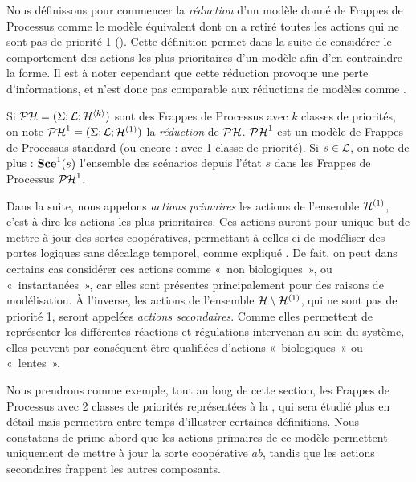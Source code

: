 Nous définissons pour commencer la \emph{réduction} d'un modèle donné de Frappes de Processus
comme le modèle équivalent dont on a retiré toutes les actions qui ne sont pas de priorité 1
().
Cette définition permet dans la suite de considérer le comportement des actions les plus prioritaires
d'un modèle afin d'en contraindre la forme.
Il est à noter cependant que cette réduction provoque une perte d'informations,
et n'est donc pas comparable aux réductions de modèles comme \cite{Naldi09}.

\begin{definition}
  Si $\PH = (\PHs; \PHl; \PHh^{\langle k \rangle})$ sont des Frappes de Processus avec $k$
  classes de priorités, on note $\reduction[\PH] = (\PHs; \PHl; \PHh^{(1)})$
  la \emph{réduction} de $\PH$.
  $\reduction$ est un modèle de Frappes de Processus standard
  (ou encore : avec 1 classe de priorité).
  Si $s \in \PHl$, on note de plus : $\reduction[\Sce](s)$ l'ensemble des scénarios
  depuis l'état $s$ dans les Frappes de Processus $\reduction$.
\end{definition}


Dans la suite, nous appelons \emph{actions primaires} les actions de l'ensemble $\PHh^{(1)}$,
c'est-à-dire les actions les plus prioritaires.
Ces actions auront pour unique but de mettre à jour des sortes coopératives, permettant
à celles-ci de modéliser des portes logiques sans décalage temporel,
comme expliqué .
De fait, on peut dans certains cas considérer ces actions comme «~non biologiques~»,
ou «~instantanées~»,
car elles sont présentes principalement pour des raisons de modélisation.
À l'inverse, les actions de l'ensemble $\PHh \setminus \PHh^{(1)}$, qui ne sont pas de priorité 1,
seront appelées \emph{actions secondaires}.
Comme elles permettent de représenter les différentes réactions et régulations intervenan
au sein du
système, elles peuvent par conséquent être qualifiées d'actions «~biologiques~» ou «~lentes~».

\begin{example}
  Nous prendrons comme exemple, tout au long de cette section,
  les Frappes de Processus avec 2 classes de priorités représentées à la ,
  qui sera étudié plus en détail 
  mais permettra entre-temps d'illustrer certaines définitions.
  Nous constatons de prime abord que les actions primaires de ce modèle
  permettent uniquement de mettre à jour la sorte coopérative $ab$,
  tandis que les actions secondaires frappent les autres composants.
\end{example}


